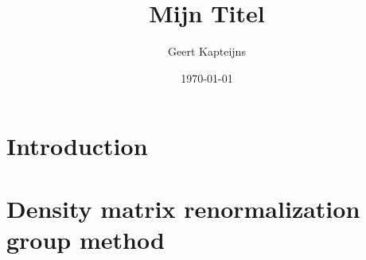 \documentclass[9pt, ebook, openany, oneside]{memoir}
\renewcommand{\afterchaptertitle}{%
 \vskip2em
 \hrule height 0.6pt
 \vskip2em
 }
\begin{document}
\pagestyle{simple}



\frontmatter

\title{Mijn Titel}
\author{Geert Kapteijns}
\date{\today}


\begingroup
\renewcommand{\afterchaptertitle}{\vskip1.5em}

\tableofcontents*
\endgroup

\mainmatter

\chapter{Introduction}

\chapter{Density matrix renormalization group method}

\end{document}
